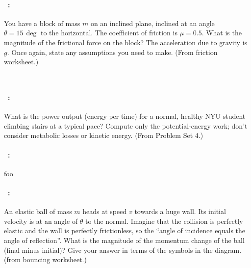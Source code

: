 \documentclass[12pt]{article} 
\begin{document}
\vfill

\paragraph{\problemname~\theproblem:}%
You have a block of mass $m$ on an inclined
plane, inclined at an angle $\theta=15\,\deg$ to the horizontal. The
coefficient of friction is $\mu=0.5$. What is the magnitude of the
frictional force on the block? The acceleration due to gravity is $g$.
Once again, state any assumptions you need to make.
(From friction worksheet.)

\vfill
~
\clearpage

\paragraph{\problemname~\theproblem:}%
What is the power output (energy per time) for a normal, healthy NYU
student climbing stairs at a typical pace? Compute only the
potential-energy work; don't consider metabolic losses or kinetic
energy.
(From Problem Set 4.)

\vfill

\paragraph{\problemname~\theproblem:}%
foo

\vfill

\paragraph{\problemname~\theproblem:}%
An elastic ball of mass $m$ heads at speed $v$ towards a huge wall.
Its initial velocity is at an angle of $\theta$ to the normal.
Imagine that the collision is perfectly elastic and the
wall is perfectly frictionless, so the ``angle of incidence equals the
angle of reflection''. What is the magnitude of the momentum change of the ball (final
minus initial)?
Give your answer in terms of the symbols in the diagram.
(from bouncing worksheet.)
\end{document}

